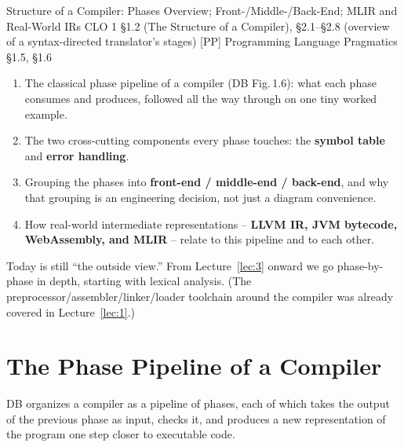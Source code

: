 \documentclass[full-course-notes.tex]{subfiles}
\begin{document}
  {Structure of a Compiler: Phases Overview; Front-/Middle-/Back-End; MLIR and Real-World IRs}
  {CLO 1}
  {\S1.2 (The Structure of a Compiler), \S2.1--\S2.8 (overview of a syntax-directed translator's stages)}
  {[PP] Programming Language Pragmatics \S1.5, \S1.6}
\setcounter{section}{0}
\makelecturetitle

\begin{coreidea}
\begin{enumerate}
  \item The classical phase pipeline of a compiler (DB Fig.\,1.6): what each phase consumes and
  produces, followed all the way through on one tiny worked example.
  \item The two cross-cutting components every phase touches: the \textbf{symbol table} and
  \textbf{error handling}.
  \item Grouping the phases into \textbf{front-end / middle-end / back-end}, and why that
  grouping is an engineering decision, not just a diagram convenience.
  \item How real-world intermediate representations -- \textbf{LLVM IR, JVM bytecode,
  WebAssembly, and MLIR} -- relate to this pipeline and to each other.
\end{enumerate}
Today is still ``the outside view.'' From Lecture~\ref{lec:3} onward we go phase-by-phase in
depth, starting with lexical analysis. (The preprocessor/assembler/linker/loader toolchain
around the compiler was already covered in Lecture~\ref{lec:1}.)
\end{coreidea}

\section{The Phase Pipeline of a Compiler}
\label{sec:l2-phase-pipeline}

\dbtag DB organizes a compiler as a pipeline of phases, each of which takes the output of the
previous phase as input, checks it, and produces a new representation of the program one step
closer to executable code.

\begin{center}
\end{center}
\end{document}
